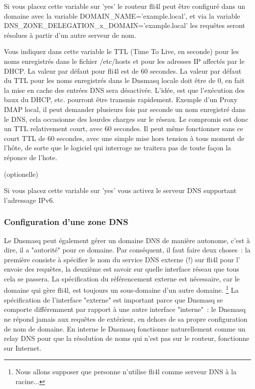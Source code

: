 \begin{description}

      {Si vous placez cette variable sur 'yes' le routeur fli4l peut être configuré
      dans un domaine avec la variable DOMAIN\_NAME='example.local', et via la
      variable DNS\_ZONE\_DELEGATION\_x\_DOMAIN='example.local'} les requêtes
      seront résolues à partir d'un autre serveur de nom.


      {Vous indiquez dans cette variable le TTL (Time To Live, en seconde) pour
      les noms enregistrés dans le fichier /etc/hosts et pour les adresses IP
      affectés par le DHCP. La valeur par défaut pour fli4l est de 60 secondes.
      La valeur par défaut du TTL pour les noms enregistrés dans le Dnsmasq locale
      doit être de 0, en fait la mise en cache des entrées DNS sera désactivée.
      L'idée, est que l'exécution des baux du DHCP, etc. pourront être transmis
      rapidement. Exemple d'un Proxy IMAP local, il peut demander plusieurs fois
      par seconde un nom enregistré dans le DNS, cela occasionne des lourdes charges
      sur le réseau. Le compromis est donc un TTL relativement court, avec
      60 secondes. Il peut même fonctionner sans ce court TTL de 60 secondes,
      avec une simple mise hors tension à tous moment de l'hôte, de sorte que le
      logiciel qui interroge ne traitera pas de toute façon la réponce de l'hote.}

      (optionelle)

      {Si vous placez cette variable sur 'yes' vous activez le serveur DNS
      supportant l'adressage IPv6.}
\end{description}

\subsubsection{Configuration d'une zone DNS}

      Le Dnsmasq peut également gérer un domaine DNS de manière autonome,
	  c'est à dire, il a "autorité" pour ce domaine. Par conséquent, il faut
	  faire deux choses~: la première consiste à spécifier le nom du service
	  DNS externe (!) sur fli4l pour l' envoie des requètes, la deuxième est
	  savoir sur quelle interface réseau que tous cela se passera. La spécification
	  du référencement externe est nécessaire, car le domaine qui gère fli4l,
	  est toujours un sous-domaine d'un autre domaine. \footnote{Nous allons
	  supposer que personne n'utilise fli4l comme serveur DNS à la racine...}
	  La spécification de l'interface "externe" est important parce que Dnsmasq
	  se comporte différemment par rapport à une autre interface "interne"~:
	  le Dnsmasq ne répond jamais aux requêtes de extérieur, en dehors de sa
	  propre configuration de nom de domaine. En interne le Dnsmasq fonctionne
	  naturellement comme un relay DNS pour que la résolution de noms qui n'est
	  pas sur le routeur, fonctionne sur Internet.

